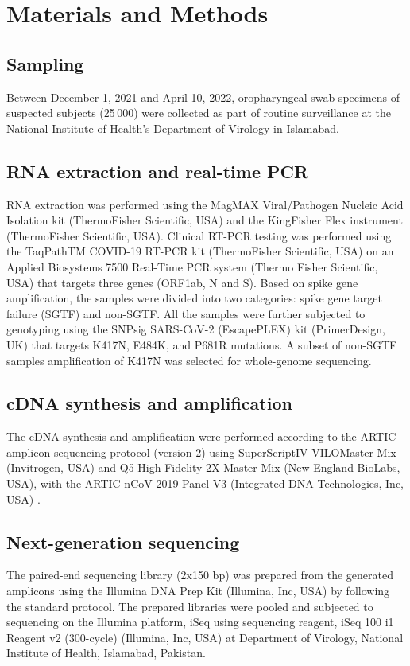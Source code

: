 \section{Materials and Methods}\label{sec-mm}

\subsection{Sampling}\label{2:mm-sampling}
Between December 1, 2021 and April 10, 2022, oropharyngeal swab specimens of suspected subjects (25\,000) were collected as part of routine surveillance at the National Institute of Health's Department of Virology in Islamabad.


\subsection{RNA extraction and real-time PCR}\label{2:mm-pcr}
RNA extraction was performed using the MagMAX Viral/Pathogen Nucleic Acid Isolation kit (ThermoFisher Scientific, USA) and the KingFisher Flex instrument (ThermoFisher Scientific, USA).
Clinical RT-PCR testing was performed using the TaqPathTM COVID-19 RT-PCR kit (ThermoFisher Scientific, USA) on an Applied Biosystems 7500 Real-Time PCR system (Thermo Fisher Scientific, USA) that targets three genes (ORF1ab, N and S).
Based on spike gene amplification, the samples were divided into two categories: spike gene target failure (SGTF) and non-SGTF.
All the samples were further subjected to genotyping using the SNPsig\textsuperscript{\textregistered} SARS-CoV-2 (EscapePLEX) kit (PrimerDesign, UK) that targets K417N, E484K, and P681R mutations.
A subset of non-SGTF samples amplification of K417N was selected for whole-genome sequencing.


\subsection{cDNA synthesis and amplification }\label{2:mm-amp}
The cDNA synthesis and amplification were performed according to the ARTIC amplicon sequencing protocol (version 2) using SuperScript\texttrademark IV VILO\texttrademark Master Mix (Invitrogen, USA) and Q5\textsuperscript{\textregistered} High-Fidelity 2X Master Mix (New England BioLabs, USA), with the ARTIC nCoV-2019 Panel V3 (Integrated DNA Technologies, Inc, USA) \citep{quick2020ncov}.


\subsection{Next-generation sequencing}\label{2:mm-seq}
The paired-end sequencing library (2x150 bp) was prepared from the generated amplicons using the Illumina DNA Prep Kit (Illumina, Inc, USA) by following the standard protocol.
The prepared libraries were pooled and subjected to sequencing on the Illumina platform, iSeq using sequencing reagent, iSeq 100 i1 Reagent v2 (300-cycle) (Illumina, Inc, USA) at Department of Virology, National Institute of Health, Islamabad, Pakistan.


